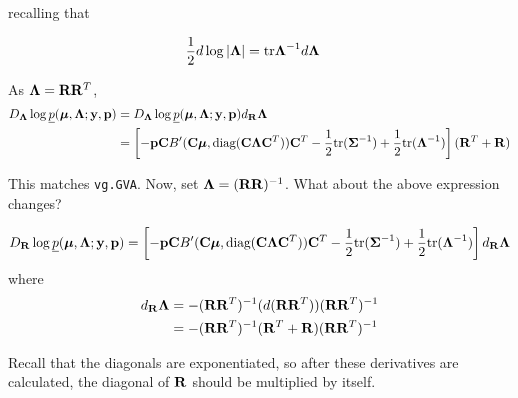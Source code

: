 \documentclass{article}[12pt]
\begin{document}
\noindent recalling that

\begin{align*}
	{\frac{1}{2}} d \log |{\boldsymbol \Lambda}| &= \text{tr} {\boldsymbol\Lambda}^{-1} d {\boldsymbol \Lambda}
\end{align*}

\noindent As ${\boldsymbol \Lambda} = {\bf R} {\bf R}^T$,
\begin{align*}
	D_{\boldsymbol \Lambda} \log \underline{p}({\boldsymbol \mu}, {\boldsymbol \Lambda}; {\bf y}, {\bf p}) &= D_{\boldsymbol \Lambda} \log \underline{p}({\boldsymbol \mu}, {\boldsymbol \Lambda}; {\bf y}, {\bf p}) d_{\bf R} {\boldsymbol \Lambda} \\
	&= \left [-{\bf p} {\bf C} B'({\bf C} {\boldsymbol \mu}, \text{diag}{({\bf C}{\boldsymbol\Lambda}{\bf C}^T)}) {\bf C}^T - {\frac{1}{2}} \text{tr}{({\boldsymbol\Sigma}^{-1})} + {\frac{1}{2}} \text{tr}{({\boldsymbol\Lambda}^{-1})}\right ] ({\bf R}^T + {\bf R})
\end{align*}

\noindent This matches \texttt{vg.GVA}. Now, set ${\boldsymbol \Lambda} = ({\bf R} {\bf R})^{-1}$. What about the
above expression changes?

\[
	D_{\bf R} \log \underline{p}({\boldsymbol \mu}, {\boldsymbol \Lambda}; {\bf y}, {\bf p}) = \left [ -{\bf p} {\bf C} B'({\bf C} {\boldsymbol \mu}, \text{diag}{({\bf C}{\boldsymbol\Lambda}{\bf C}^T)}) {\bf C}^T - {\frac{1}{2}} \text{tr}{({\boldsymbol\Sigma}^{-1})} + {\frac{1}{2}} \text{tr}{({\boldsymbol\Lambda}^{-1})} \right ] d_{\bf R} {\boldsymbol \Lambda}
\]
where
\begin{align*}
	d_{\bf R} {\boldsymbol \Lambda} &= -({\bf R} {\bf R}^T)^{-1} (d({\bf R} {\bf R}^T)) ({\bf R} {\bf R}^T)^{-1} \\
	&=-({\bf R} {\bf R}^T)^{-1} ({\bf R}^T + {\bf R}) ({\bf R} {\bf R}^T)^{-1} \\
\end{align*}

\noindent Recall that the diagonals are exponentiated, so after these derivatives are
calculated, the diagonal of ${\bf R}$ should be multiplied by itself.
\end{document}
